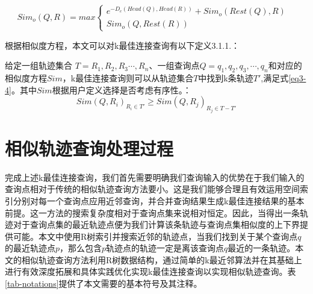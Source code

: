 \begin{equation} 
\label{eq3-3} 
Sim_{o}(Q,R)= max \left\{  
	\begin{array}{lr}  
    e^{-D_{e}(Head(Q), Head(R))} + Sim_{o}(Rest(Q),R) & \\
    Sim_{o}(Q,Rest(R)) &  
    \end{array}  
\right.  
\end{equation}  

根据相似度方程，本文可以对k最佳连接查询有以下定义3.1.1.：


\theoremstyle{definition}
\begin{definition}
	给定一组轨迹集合 $T = {R_{1}, R_{2}, R_{3} \cdots, R_{n}}$、一组查询点$Q = {q_{1},q_{2},q_{3},\cdots, q_{n}}$和对应的相似度方程$Sim$，k最佳连接查询则可以从轨迹集合$T$中找到k条轨迹$T'$,满足式\ref{eq3-4}。其中$Sim$根据用户定义选择是否考虑有序性。：
	\begin{equation}
		\label{eq3-4}
		Sim(Q,R_{i})_{R_{i} \in T'} \geq Sim(Q,R_{j})_{R_{j} \in T-T'}
	\end{equation}
\end{definition}

\section{相似轨迹查询处理过程}
\label{sec:query processing}
完成上述k最佳连接查询，我们首先需要明确我们查询输入的优势在于我们输入的查询点相对于传统的相似轨迹查询方法要小。这是我们能够合理且有效运用空间索引分别对每一个查询点应用近邻查询，并合并查询结果生成k最佳连接结果的基本前提。这一方法的搜索复杂度相对于查询点集来说相对恒定。因此，当得出一条轨迹对于查询点集的最近轨迹点便为我们计算该条轨迹与查询点集相似度的上下界提供可能。本文中使用R树索引并搜索近邻的轨迹点，当我们找到关于某个查询点$q$的最近轨迹点$p$，那么包含$p$轨迹点的轨迹一定是离该查询点$q$最近的一条轨迹。本文的相似轨迹查询方法利用R树数据结构，通过简单的k最近邻算法并在其基础上进行有效深度拓展和具体实践优化实现k最佳连接查询以实现相似轨迹查询。表\ref{tab-notations}提供了本文需要的基本符号及其注释。
\\

